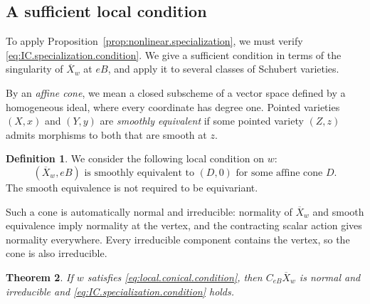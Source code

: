 \documentclass[11pt]{amsart}
\numberwithin{equation}{section}
\newtheorem{theorem}{Theorem}[section]
\theoremstyle{definition}
\newtheorem{definition}[theorem]{Definition}
\begin{document}
\subsection{A sufficient local condition}\label{ss:nonlinear.conical}

To apply Proposition~\ref{prop:nonlinear.specialization}, we must verify \eqref{eq:IC.specialization.condition}. 
We give a sufficient condition in terms of the singularity of $\overline X_w$ at $eB$, and apply it to several classes of Schubert varieties.

By an \emph{affine cone}, we mean a closed subscheme of a vector space defined by a homogeneous ideal, where every coordinate has degree one.
Pointed varieties $(X,x)$ and $(Y,y)$ are \emph{smoothly equivalent} if some pointed variety $(Z,z)$ admits morphisms to both that are smooth at $z$. %


\begin{definition}\label{def:local.conical}
We consider the following local condition on $w$:
\begin{equation}\tag{LC}\label{eq:local.conical.condition}
(\overline X_w,eB)\text{ is smoothly equivalent to }(D,0)
\text{ for some affine cone }D.
\end{equation}
The smooth equivalence is not required to be equivariant.
\end{definition}
Such a cone is automatically normal and irreducible: normality of $\overline X_w$ and smooth equivalence imply normality at the vertex, and the contracting scalar action gives normality everywhere.
Every irreducible component contains the vertex, so the cone is also irreducible.

\begin{theorem}\label{thm:local.conical}
If $w$ satisfies \eqref{eq:local.conical.condition}, then $C_{eB}\overline X_w$ is normal and irreducible and \eqref{eq:IC.specialization.condition} holds.
\end{theorem}
\end{document}
